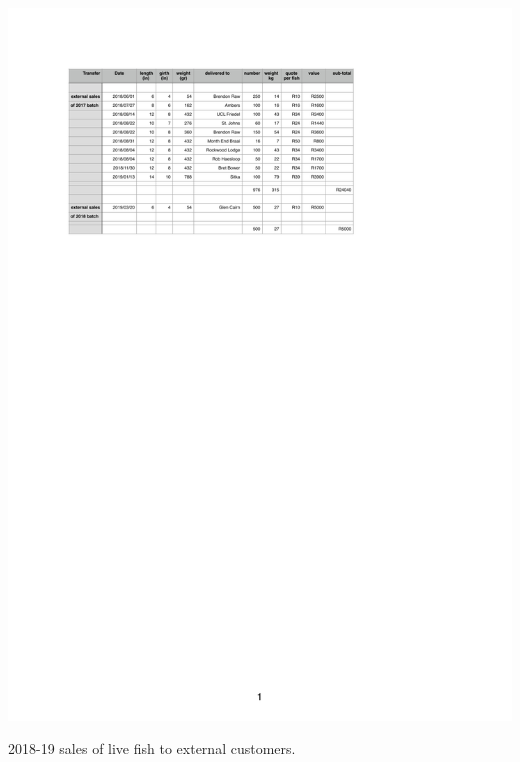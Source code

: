 \begin{table}[H]
  \centering
  \includegraphics[scale = 1.2]{tables/TablesExternalSales.pdf}
   \caption{2018-19 sales of live fish to external customers.}
  \label{tab:ExternalSales2018}
\end{table}

